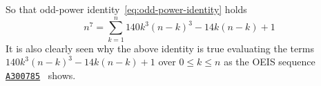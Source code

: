So that odd-power identity~\eqref{eq:odd-power-identity} holds
\begin{equation*}
    n^7 = \sum_{k=1}^{n} 140 k^3 (n-k)^3 - 14k(n-k) + 1
\end{equation*}
It is also clearly seen
why the above identity is true evaluating the terms $140 k^3 (n-k)^3 - 14k(n-k) + 1$ over $0 \leq k \leq n$ as
the OEIS sequence \href{https://oeis.org/A300785}{\texttt{A300785}}~\cite{oeis_numerical_triangle_row_sums_give_seventh_powers} shows.

